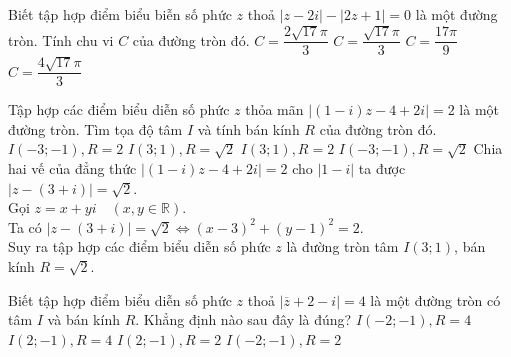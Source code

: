\begin{ex}%
Biết tập hợp điểm biểu biễn số phức $z$ thoả $|z-2i|-|2z+1|=0$ là một đường tròn. Tính chu vi $C$ của đường tròn đó.
\choice
{\True$C=\dfrac{2\sqrt{17}\pi}{3}$}
{$C=\dfrac{\sqrt{17}\pi}{3}$}
{$C=\dfrac{17\pi}{9}$}
{$C=\dfrac{4\sqrt{17}\pi}{3}$}	
\end{ex}
\begin{ex}%
Tập hợp các điểm biểu diễn số phức $z$ thỏa mãn $|(1-i)z-4+2i|=2$ là một đường tròn. Tìm tọa độ tâm $I$ và tính bán kính $R$ của đường tròn đó.
\choice
{$I(-3;-1), R=2$}
{\True $I(3;1),R=\sqrt{2}$}
{$I(3;1), R=2$}
{$I(-3;-1), R=\sqrt{2}$}
	\loigiai
{
	Chia hai vế của đẳng thức $|(1-i)z-4+2i|=2$ cho $|1-i|$ ta được $|z-(3+i)|=\sqrt{2}$.\\
Gọi $z=x+yi \quad (x,y\in\mathbb{R})$.\\
Ta có  	$|z-(3+i)|=\sqrt{2}\Leftrightarrow (x-3)^2+(y-1)^2=2$.\\
	 Suy ra tập hợp các điểm biểu diễn số phức $z$ là đường tròn tâm $I(3;1)$, bán kính $R=\sqrt{2}$.
}
\end{ex}
\begin{ex}%
Biết tập hợp điểm biểu diễn số phức $z$ thoả $\left|\overline{z}+2-i\right|=4$ là một đường tròn có tâm $I$ và bán kính $R$. Khẳng định nào sau đây là đúng?
\choice
{\True$I(-2;-1), R=4$}
{$I(2;-1), R=4$}
{$I(2;-1), R=2$}
{$I(-2;-1), R=2$}
	
\end{ex}

